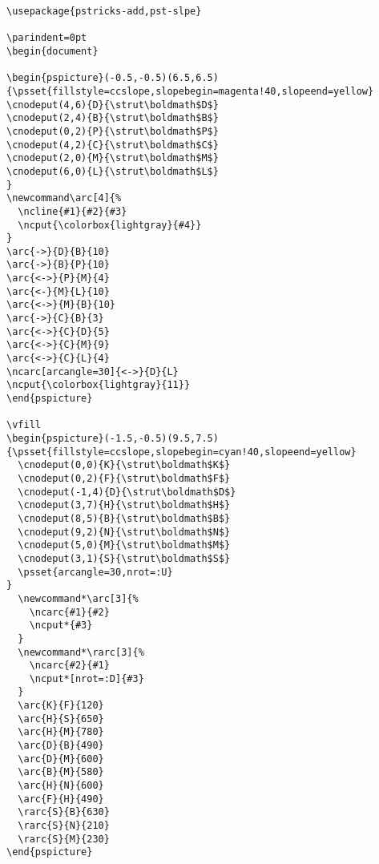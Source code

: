 \documentclass{article}
\begin{document}
\clearpage
\small
\begin{verbatim}
\usepackage{pstricks-add,pst-slpe}

\parindent=0pt
\begin{document}

\begin{pspicture}(-0.5,-0.5)(6.5,6.5)
{\psset{fillstyle=ccslope,slopebegin=magenta!40,slopeend=yellow}
\cnodeput(4,6){D}{\strut\boldmath$D$}
\cnodeput(2,4){B}{\strut\boldmath$B$}
\cnodeput(0,2){P}{\strut\boldmath$P$}
\cnodeput(4,2){C}{\strut\boldmath$C$}
\cnodeput(2,0){M}{\strut\boldmath$M$}
\cnodeput(6,0){L}{\strut\boldmath$L$}
}
\newcommand\arc[4]{%
  \ncline{#1}{#2}{#3}
  \ncput{\colorbox{lightgray}{#4}}
}
\arc{->}{D}{B}{10}
\arc{->}{B}{P}{10}
\arc{<->}{P}{M}{4}
\arc{<-}{M}{L}{10}
\arc{<->}{M}{B}{10}
\arc{->}{C}{B}{3}
\arc{<->}{C}{D}{5}
\arc{<->}{C}{M}{9}
\arc{<->}{C}{L}{4}
\ncarc[arcangle=30]{<->}{D}{L}
\ncput{\colorbox{lightgray}{11}}
\end{pspicture}

\vfill
\begin{pspicture}(-1.5,-0.5)(9.5,7.5)
{\psset{fillstyle=ccslope,slopebegin=cyan!40,slopeend=yellow}
  \cnodeput(0,0){K}{\strut\boldmath$K$}
  \cnodeput(0,2){F}{\strut\boldmath$F$}
  \cnodeput(-1,4){D}{\strut\boldmath$D$}
  \cnodeput(3,7){H}{\strut\boldmath$H$}
  \cnodeput(8,5){B}{\strut\boldmath$B$}
  \cnodeput(9,2){N}{\strut\boldmath$N$}
  \cnodeput(5,0){M}{\strut\boldmath$M$}
  \cnodeput(3,1){S}{\strut\boldmath$S$}
  \psset{arcangle=30,nrot=:U}
}
  \newcommand*\arc[3]{%
    \ncarc{#1}{#2}
    \ncput*{#3}
  }
  \newcommand*\rarc[3]{%
    \ncarc{#2}{#1}
    \ncput*[nrot=:D]{#3}
  }
  \arc{K}{F}{120}
  \arc{H}{S}{650}
  \arc{H}{M}{780}
  \arc{D}{B}{490}
  \arc{D}{M}{600}
  \arc{B}{M}{580}
  \arc{H}{N}{600}
  \arc{F}{H}{490}
  \rarc{S}{B}{630}
  \rarc{S}{N}{210}
  \rarc{S}{M}{230}
\end{pspicture}
\end{verbatim}
\end{document}
